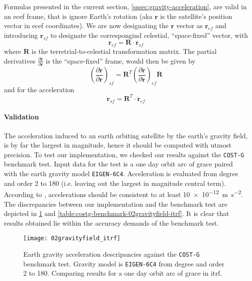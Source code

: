 Formulas presented in the current section, \ref{sssec:gravity-acceleration}, 
are valid in an \gls{ecef} frame, that is ignore Earth's rotation (aka $\bm{r}$ is 
the satellite's position vector in \gls{ecef} coordinates). We are now designating 
the $\bm{r}$ vector as $\bm{r}_{ef}$ and introducing $\bm{r}_{sf}$ to designate the 
correspongind celestial, ``space-fixed'' vector, with 
\begin{equation}
  \bm{r}_{ef} = \bm{R} \cdot \bm{r}_{sf}
\end{equation}
where $\bm{R}$ is the terretrial-to-celestial transformation matrix. The partial 
derivatives $\frac{\partial \bm{\ddot{r}}}{\partial \bm{r}}$ is the ``space-fixed'' 
frame, would then be given by
\begin{equation}
  \left( \frac{\partial \bm{\ddot{r}}}{\partial \bm{r}} \right) _{sf} = 
  \bm{R}^T 
  \left( \frac{\partial \bm{\ddot{r}}}{\partial \bm{r}} \right) _{ef}
  \bm{R}
\end{equation}
and for the acceleration
\begin{equation}
  \bm{\ddot{r}}_{sf} = \bm{R}^T \cdot \bm{\ddot{r}}_{ef}
\end{equation}

\paragraph{Validation}\label{sssec:gravity-acceleration-acceleration}

The acceleration induced to an earth orbiting satellite by the earth's gravity 
field, is by far the largest in magnitude, hence it should be computed with utmost 
precision. To test our implementation, we checked our results against the \texttt{COST-G} 
benchmark test. Input data for the test is a one day orbit arc of \gls{grace} paired
with the earth gravity model \texttt{EIGEN-6C4}. Acceleration is evaluated from degree
and order 2 to 180 (i.e. leaving out the largest in magnitude central term). According 
to \cite{Lasser23}, accelerations should be consistent to at least \SI{10e-12}{\metre\per\square\second}.
The discrepancies between our implementation and the benchmark test are depicted in 
\ref{fig:costg-benchmark-02gravityfield-itrf} and \ref{table:costg-benchmark-02gravityfield-itrf}. 
It is clear that results obtained lie within the accuracy demands of the benchmark test.

\begin{figure}
  \centering
  \texttt{[image: 02gravityfield\_itrf]}
  \caption{Earth gravity acceleration descripancies against the \texttt{COST-G} 
    benchmark test. Gravity model is \texttt{EIGEN-6C4} from degree and order 2 to 180. 
    Comparing results for a one day orbit arc of \gls{grace} in \gls{itrf}.}
  \label{fig:costg-benchmark-02gravityfield-itrf}
\end{figure}

